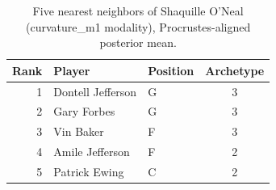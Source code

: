 \begin{table}[htbp]
  \centering\small
  \begin{tabular}{rllc}
    \toprule
    Rank & Player & Position & Archetype \\
    \midrule
    1 & Dontell Jefferson & G & 3 \\
    2 & Gary Forbes & G & 3 \\
    3 & Vin Baker & F & 3 \\
    4 & Amile Jefferson & F & 2 \\
    5 & Patrick Ewing & C & 2 \\
    \bottomrule
  \end{tabular}
  \caption{Five nearest neighbors of Shaquille O'Neal (curvature_m1 modality), Procrustes-aligned posterior mean.}
  \label{tab:Shaquille_O_Neal_neighbors_curvature_m1}
\end{table}

